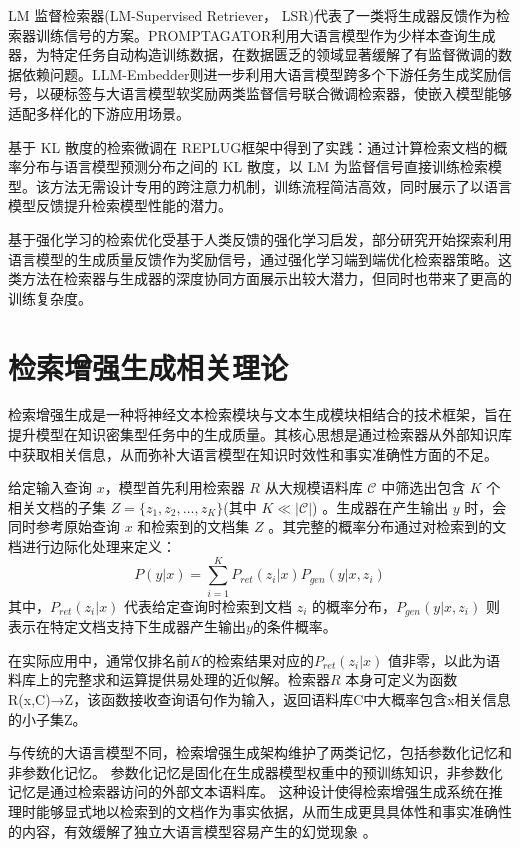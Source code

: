 \documentclass[promaster, vlined]{DissertUESTC}
\begin{document}
LM 监督检索器(LM-Supervised Retriever， LSR)代表了一类将生成器反馈作为检索器训练信号的方案。PROMPTAGATOR\cite{dai2022promptagator}利用大语言模型作为少样本查询生成器，为特定任务自动构造训练数据，在数据匮乏的领域显著缓解了有监督微调的数据依赖问题。LLM-Embedder\cite{zhang2023llmembedder}则进一步利用大语言模型跨多个下游任务生成奖励信号，以硬标签与大语言模型软奖励两类监督信号联合微调检索器，使嵌入模型能够适配多样化的下游应用场景。

基于 KL 散度的检索微调在 REPLUG\cite{shi2023replug}框架中得到了实践：通过计算检索文档的概率分布与语言模型预测分布之间的 KL 散度，以 LM 为监督信号直接训练检索模型。该方法无需设计专用的跨注意力机制，训练流程简洁高效，同时展示了以语言模型反馈提升检索模型性能的潜力。

基于强化学习的检索优化受基于人类反馈的强化学习启发，部分研究开始探索利用语言模型的生成质量反馈作为奖励信号，通过强化学习端到端优化检索器策略\cite{nakano2021webgpt}。这类方法在检索器与生成器的深度协同方面展示出较大潜力，但同时也带来了更高的训练复杂度。
\section{检索增强生成相关理论}
检索增强生成是一种将神经文本检索模块与文本生成模块相结合的技术框架，旨在提升模型在知识密集型任务中的生成质量。其核心思想是通过检索器从外部知识库中获取相关信息，从而弥补大语言模型在知识时效性和事实准确性方面的不足。

给定输入查询 $x$，模型首先利用检索器 $R$ 从大规模语料库 $\mathcal{C}$ 中筛选出包含 $K$ 个相关文档的子集 $Z=\{z_{1}, z_{2}, \dots, z_{K}\}$(其中 $K \ll |\mathcal{C}|$) 。生成器在产生输出 $y$ 时，会同时参考原始查询 $x$ 和检索到的文档集 $Z$ 。其完整的概率分布通过对检索到的文档进行边际化处理来定义：
\begin{equation}
P(y|x)=\sum_{i=1}^{K}P_{ret}(z_{i}|x)P_{gen}(y|x,z_{i})
\end{equation}
其中，$P_{ret}(z_{i}|x)$ 代表给定查询时检索到文档 $z_{i}$ 的概率分布，$P_{gen}(y|x,z_{i})$ 则表示在特定文档支持下生成器产生输出$y$的条件概率。

在实际应用中，通常仅排名前$K$的检索结果对应的$P_{ret}(z_{i}|x)$ 值非零，以此为语料库上的完整求和运算提供易处理的近似解。检索器$R$ 本身可定义为函数R(x,C)→Z，该函数接收查询语句作为输入，返回语料库C中大概率包含x相关信息的小子集Z。

与传统的大语言模型不同，检索增强生成架构维护了两类记忆，包括参数化记忆和非参数化记忆\cite{lewis2020retrieval}。
参数化记忆是固化在生成器模型权重中的预训练知识，非参数化记忆是通过检索器访问的外部文本语料库。
这种设计使得检索增强生成系统在推理时能够显式地以检索到的文档作为事实依据，从而生成更具具体性和事实准确性的内容，有效缓解了独立大语言模型容易产生的幻觉现象 。
\end{document}
